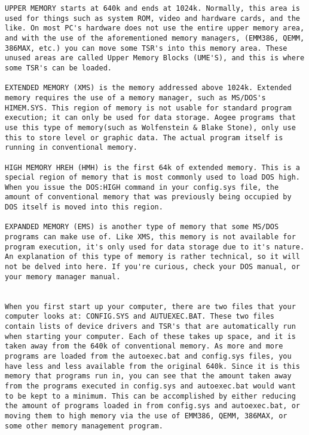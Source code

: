 \documentclass[book.tex]{subfiles}
\begin{document}
\begin{lstlisting}[breaklines=true,breakindent=0em]
UPPER MEMORY starts at 640k and ends at 1024k. Normally, this area is used for things such as system ROM, video and hardware cards, and the like. On most PC's hardware does not use the entire upper memory area, and with the use of the aforementioned memory managers, (EMM386, QEMM, 386MAX, etc.) you can move some TSR's into this memory area. These unused areas are called Upper Memory Blocks (UME'S), and this is where some TSR's can be loaded.

EXTENDED MEMORY (XMS) is the memory addressed above 1024k. Extended memory requires the use of a memory manager, such as MS/DOS's HIMEM.SYS. This region of memory is not usable for standard program execution; it can only be used for data storage. Aogee programs that use this type of memory(such as Wolfenstein & Blake Stone), only use this to store level or graphic data. The actual program itself is running in conventional memory. 

HIGH MEMORY HREH (HMH) is the first 64k of extended memory. This is a special region of memory that is most commonly used to load DOS high. When you issue the DOS:HIGH command in your config.sys file, the amount of conventional memory that was previously being occupied by DOS itself is moved into this region.

EXPANDED MEMORY (EMS) is another type of memory that some MS/DOS programs can make use of. Like XMS, this memory is not available for program execution, it's only used for data storage due to it's nature. An explanation of this type of memory is rather technical, so it will not be delved into here. If you're curious, check your DOS manual, or your memory manager manual.


When you first start up your computer, there are two files that your computer looks at: CONFIG.SYS and AUTUEXEC.BAT. These two files contain lists of device drivers and TSR's that are automatically run when starting your computer. Each of these takes up space, and it is taken away from the 640k of conventional memory. As more and more programs are loaded from the autoexec.bat and config.sys files, you have less and less available from the original 640k. Since it is this memory that programs run in, you can see that the amount taken away from the programs executed in config.sys and autoexec.bat would want to be kept to a minimum. This can be accomplished by either reducing the amount of programs loaded in from config.sys and autoexec.bat, or moving them to high memory via the use of EMM386, QEMM, 386MAX, or some other memory management program.   
   \end{lstlisting}

 
\end{document}

